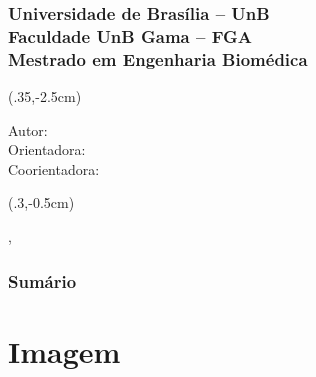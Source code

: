 





	

	\begin{frame}	
		\frametitle{\tiny  \textbf{Universidade de Brasília – UnB\\Faculdade UnB Gama – FGA\\ \vspace{0.8mm} Mestrado em Engenharia Biomédica\\ \qquad}}
		\titlepage
		
		\begin{textblock*}{100mm}(.35\textwidth,-2.5cm)
			\begin{flushright}
				\footnotesize
				Autor: \imprimirAutor\\
				Orientadora: \imprimirOrientador\\
				Coorientadora: \imprimirCoorientador
			\end{flushright}
		\end{textblock*}

		\begin{textblock*}{50mm}(.3\textwidth,-0.5cm)
			\begin{center}
				\footnotesize
				\imprimirLocal, \imprimirData\\
				\imprimirInstituicao
			\end{center}
		\end{textblock*}

	\end{frame}
	
	\begin{frame}
		\frametitle{Sum\'{a}rio}
		\tableofcontents%
	\end{frame}
	
	\section{Imagem}


